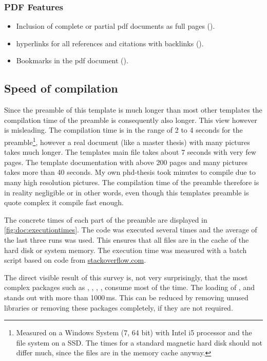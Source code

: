 \subsubsection*{PDF Features}
\begin{itemize}
\item Inclusion of complete or partial pdf documents as full pages ().
%
\item hyperlinks for all references and citations with backlinks ().
%
\item Bookmarks in the pdf document ().
\end{itemize}

\subsection{Speed of compilation}
Since the preamble of this template is much longer than most other templates the compilation time of the preamble is consequently also longer. This view however is misleading. The compilation time is in the range of 2 to 4 seconds for the preamble\footnote{Measured on a Windows System (7, 64 bit) with Intel i5 processor and the file system on a SSD. The times for a standard magnetic hard disk should not differ much, since the files are in the memory cache anyway.}, however a real document (like a master thesis) with many pictures takes much longer. The templates main file takes about 7 seconds with very few pages. The template documentation with above 200 pages and many pictures takes more than 40 seconds. My own phd-thesis took minutes to compile due to many high resolution pictures. The compilation time of the preamble therefore is in reality negligible or in other words, even though this templates preamble is quote complex it compile fast enough.

The concrete times of each part of the preamble are displayed in \cref{fig:doc:executiontimes}. The code was executed several times and the average of the last three runs was used. This ensures that all files are in the cache of the hard disk or system memory. The execution time was measured with a batch script based on code from \href{http://stackoverflow.com/questions/4313897/timer-in-dos-batch-file}{stackoverflow.com}. 

The direct visible result of this survey is, not very surprisingly, that the most complex packages such as , , , ,  consume most of the time. The loading of ,  and  stands out with more than 1000\,ms. This can be reduced by removing unused libraries or removing these packages completely, if they are not required.

